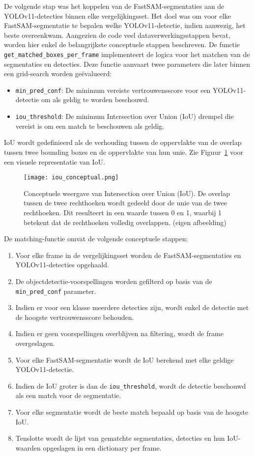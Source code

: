 De volgende stap was het koppelen van de FastSAM-segmentaties aan de YOLOv11-detecties binnen elke vergelijkingsset.
Het doel was om voor elke FastSAM-segmentatie te bepalen welke YOLOv11-detectie, indien aanwezig, het beste overeenkwam.
Aangezien de code veel dataverwerkingsstappen bevat, worden hier enkel de belangrijkste conceptuele stappen beschreven.
De functie \texttt{get\_matched\_boxes\_per\_frame} implementeert de logica voor het matchen van de segmentaties en detecties.
Deze functie aanvaart twee parameters die later binnen een grid-search worden geëvalueerd:
\begin{itemize}
  \item \texttt{min\_pred\_conf}: De minimum vereiste vertrouwensscore voor een YOLOv11-detectie om als geldig te worden beschouwd.
  \item \texttt{iou\_threshold}: De minimum Intersection over Union (IoU) drempel die vereist is om een match te beschouwen als geldig.  
\end{itemize}
IoU wordt gedefinieerd als de verhouding tussen de oppervlakte van de overlap tussen twee bounding boxes en de oppervlakte van hun unie.
Zie Figuur~\ref{fig:iou-conceptual} voor een visuele representatie van IoU.

\begin{figure}[H]
    \centering
    \texttt{[image: iou\_conceptual.png]}
    \caption[Conceptuele weergave van Intersection over Union (IoU)]{
        \label{fig:iou-conceptual}
        Conceptuele weergave van Intersection over Union (IoU).
        De overlap tussen de twee rechthoeken wordt gedeeld door de unie van de twee rechthoeken.
        Dit resulteert in een waarde tussen 0 en 1, waarbij 1 betekent dat de rechthoeken volledig overlappen.
        (eigen afbeelding)
      }
\end{figure}

De matching-functie omvat de volgende conceptuele stappen:
\begin{enumerate}
    \item Voor elke frame in de vergelijkingsset worden de FastSAM-segmentaties en YOLOv11-detecties opgehaald.
    \item De objectdetectie-voorspellingen worden gefilterd op basis van de \texttt{min\_pred\_conf} parameter.
    \item Indien er voor een klasse meerdere detecties zijn, wordt enkel de detectie met de hoogste vertrouwensscore behouden.
    \item Indien er geen voorspellingen overblijven na filtering, wordt de frame overgeslagen.
    \item Voor elke FastSAM-segmentatie wordt de IoU berekend met elke geldige YOLOv11-detectie.
    \item Indien de IoU groter is dan de \texttt{iou\_threshold}, wordt de detectie beschouwd als een match voor de segmentatie.
    \item Voor elke segmentatie wordt de beste match bepaald op basis van de hoogste IoU.
    \item Tenslotte wordt de lijst van gematchte segmentaties, detecties en hun IoU-waarden opgeslagen in een dictionary per frame.
\end{enumerate}

